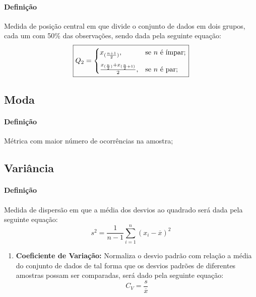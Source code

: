 \documentclass{article}
\begin{document}
            \paragraph{Definição}Medida de posição central em que divide o conjunto de dados em dois grupos, cada um com 50\% das observações, sendo dada pela seguinte equação:
                \begin{equation}
                    \boxed{
                        Q_{2} =
                        \begin{cases}
                            x_{(\frac{n+1}{2})},  & \text{se $n$ é ímpar};\vspace{2.5mm}\\
                            \frac{x_{(\frac{n}{2})} + x_{(\frac{n}{2} + 1)}}{2},  & \text{se $n$ é par};\\
                        \end{cases}
                    }
                \end{equation}

        \subsection{Moda}
            \paragraph{Definição}Métrica com maior número de ocorrências na amostra;

        \subsection{Variância}
            \paragraph{Definição}Medida de dispersão em que a média dos desvios ao quadrado será dada pela seguinte equação:
                \begin{equation}
                    \boxed{
                        s^{2} = \frac{1}{n-1} \sum_{i=1}^{n} (x_{i} - \overline{x})^{2}
                    }
                \end{equation}
                \begin{enumerate}[rightmargin=\leftmargin, noitemsep]
                    \item \textbf{Coeficiente de Variação:} Normaliza o desvio padrão com relação a média do conjunto de dados de tal forma que os desvios padrões de diferentes amostras possam ser comparadas, será dado pela seguinte equação:
                        \begin{equation}
                            \boxed{
                                C_{V} = \frac{s}{\overline{x}}
                            }
                        \end{equation}
                \end{enumerate}
\end{document}
